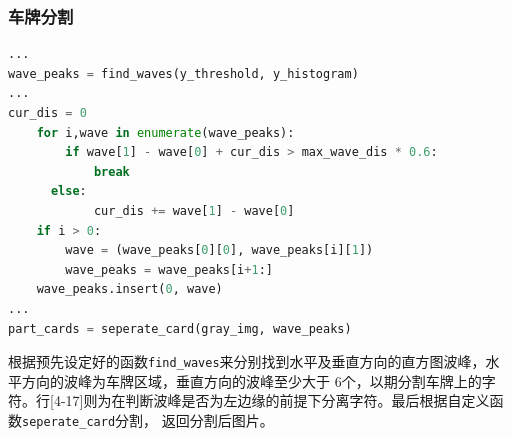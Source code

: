 \documentclass[UTF8,10pt,titlepage,a4paper]{ctexart}
\begin{document}
\subsubsection{车牌分割}
\begin{lstlisting}[language=python]
...
wave_peaks = find_waves(y_threshold, y_histogram)
...
cur_dis = 0
	for i,wave in enumerate(wave_peaks):
		if wave[1] - wave[0] + cur_dis > max_wave_dis * 0.6:
			break
	  else:
			cur_dis += wave[1] - wave[0]
	if i > 0:
		wave = (wave_peaks[0][0], wave_peaks[i][1])
		wave_peaks = wave_peaks[i+1:]
    wave_peaks.insert(0, wave)
...
part_cards = seperate_card(gray_img, wave_peaks)
\end{lstlisting} 
根据预先设定好的函数\verb|find_waves|来分别找到水平及垂直方向的直方图波峰，水平方向的波峰为车牌区域，垂直方向的波峰至少大于
6个，以期分割车牌上的字符。行[4-17]则为在判断波峰是否为左边缘的前提下分离字符。最后根据自定义函数\verb|seperate_card|分割，
返回分割后图片。
\end{document}
